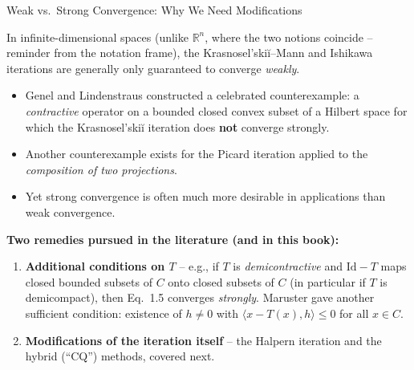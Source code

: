 \documentclass[aspectratio=169,10pt]{beamer}
\newcommand{\R}{\mathbb{R}}
\newcommand{\Id}{\mathrm{Id}}
\begin{document}
\begin{frame}{Weak vs.\ Strong Convergence: Why We Need Modifications}

In infinite-dimensional spaces (unlike $\R^n$, where the two notions
coincide -- reminder from the notation frame), the Krasnosel'ski\u{i}--Mann
and Ishikawa iterations are generally only guaranteed to converge
\emph{weakly}.

\begin{itemize}
  \item Genel and Lindenstraus constructed a celebrated counterexample: a
    \emph{contractive} operator on a bounded closed convex subset of a
    Hilbert space for which the Krasnosel'ski\u{i} iteration does
    \textbf{not} converge strongly.
  \item Another counterexample exists for the Picard iteration applied to
    the \emph{composition of two projections}.
  \item Yet strong convergence is often much more desirable in
    applications than weak convergence.
\end{itemize}

\medskip
\textbf{Two remedies pursued in the literature (and in this book):}
\begin{enumerate}
  \item \textbf{Additional conditions on $T$} -- e.g., if $T$ is
    \emph{demicontractive} and $\Id-T$ maps closed bounded subsets of $C$
    onto closed subsets of $C$ (in particular if $T$ is demicompact), then
    Eq.\ 1.5 converges \emph{strongly}. Maruster gave another sufficient
    condition: existence of $h\ne 0$ with $\langle x-T(x),h\rangle\le 0$
    for all $x\in C$.
  \item \textbf{Modifications of the iteration itself} -- the Halpern
    iteration and the hybrid (``CQ'') methods, covered next.
\end{enumerate}

\end{frame}
\end{document}
